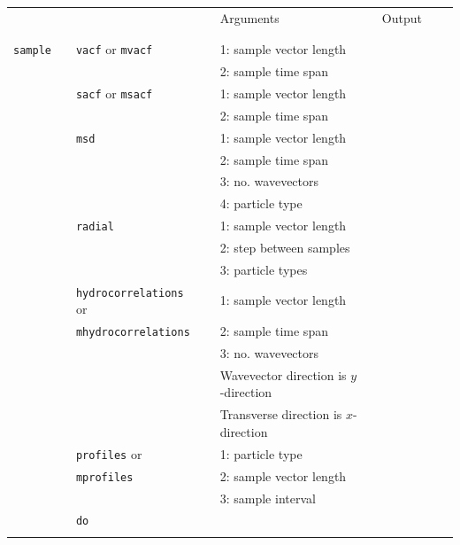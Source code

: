 \documentclass[11pt]{article}
\begin{document}
\begin{center}
  
  \begin{tabular}{cclclclll}
    {\color{red}{\textbf{Action}}} && {\color{blue}{Specifier}} && Arguments && Output \\
                                   && && && \\
    \hline
                                   && && && \\

    \verb!sample! && \verb!vacf! or \verb!mvacf! &&  1: sample vector length && \\
    $\mbox{}$   && &&  2: sample time span && \\
    $\mbox{}$   && \verb!sacf! or \verb!msacf! &&1: sample vector length && \\
    $\mbox{}$   &&                   &&  2: sample time span && \\
    $\mbox{}$   && \verb!msd! && 1: sample vector length && \\
    $\mbox{}$   &&            &&  2: sample time span && \\
    $\mbox{}$   &&            &&  3: no. wavevectors && \\
    $\mbox{}$   &&            &&  4: particle type && \\
    $\mbox{}$   && \verb!radial! &&  1: sample vector length && \\
    $\mbox{}$   &&            &&  2: step between samples  && \\
    $\mbox{}$   &&            &&  3: particle types && \\
    $\mbox{}$   && \verb!hydrocorrelations! or && 1: sample vector length && \\
    $\mbox{}$   && \verb!mhydrocorrelations!  &&  2: sample time span && \\
    $\mbox{}$   &&            &&  3: no. wavevectors && \\
	$\mbox{}$   &&            &&  Wavevector direction is $y$-direction && \\
	$\mbox{}$   &&            &&  Transverse direction is $x$-direction && \\
    $\mbox{}$   && \verb!profiles! or &&1: particle type && \\
    $\mbox{}$   && \verb!mprofiles!    &&  2: sample vector length && \\
    $\mbox{}$   &&                   &&  3: sample interval && \\
    $\mbox{}$   && \verb!do!         &&  && \\
                                   && && && \\
    

\end{tabular}
\end{center}
\end{document}
